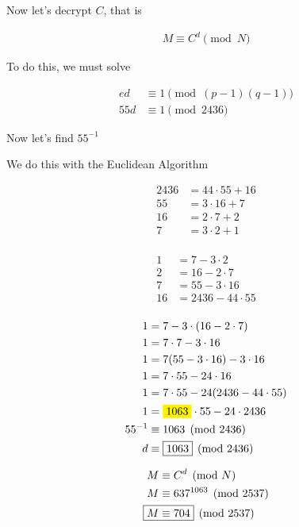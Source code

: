 \documentclass[../../Main.tex]{subfiles}
\begin{document}
\begin{example}
    Now let's decrypt $C$, that is

    \begin{align*}
        M \equiv C^d \pmod{N}
    \end{align*}

    To do this, we must solve

    \begin{align*}
        ed &\equiv 1 \pmod{(p - 1)(q - 1)} \\
        55d &\equiv 1 \pmod{2436}
    \end{align*}

    Now let's find $55^{-1}$

    We do this with the Euclidean Algorithm

    \begin{align*}
        2436 &= 44 \cdot 55 + 16 \\
        55 &= 3 \cdot 16 + 7 \\
        16 &= 2 \cdot 7 + 2 \\
        7 &= 3 \cdot 2 + 1 \\
    \end{align*}

    \begin{align*}
        1 &= 7 - 3 \cdot 2 \\
        2 &= 16 - 2 \cdot 7 \\
        7 &= 55 - 3 \cdot 16 \\
        16 &= 2436 - 44 \cdot 55 \\
    \end{align*}

    \begin{align*}
        1 &= 7 - 3 \cdot (16 - 2 \cdot 7) \\
        1 &= 7 \cdot 7 - 3 \cdot 16 \\
        1 &= 7 (55 - 3 \cdot 16) - 3 \cdot 16 \\
        1 &= 7 \cdot 55 - 24 \cdot 16 \\
        1 &= 7 \cdot 55 - 24 (2436 - 44 \cdot 55) \\
        1 &= \yellowbox{1063} \cdot 55 - 24 \cdot 2436 \\
        55^{-1} &\equiv 1063 \pmod{2436} \\
        d &\equiv \boxed{1063} \pmod{2436} \\
    \end{align*}

    \begin{align*}
        M &\equiv C^d \pmod{N} \\
        M &\equiv 637^{1063} \pmod{2537} \\
        \Aboxed{M &\equiv 704} \pmod{2537} \\
    \end{align*}

\end{example}

\end{document}

